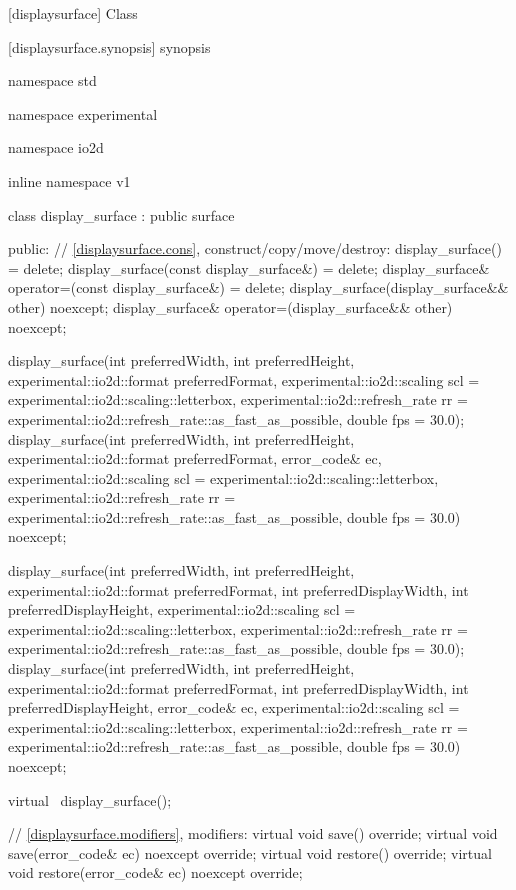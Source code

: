  [displaysurface] {Class }

 [displaysurface.synopsis] { synopsis}

\begin{codeblock}
namespace std { namespace experimental { namespace io2d { inline namespace v1 {
  class display_surface : public surface {
  public:
    // \ref{displaysurface.cons}, construct/copy/move/destroy:
    display_surface() = delete;
    display_surface(const display_surface&) = delete;
    display_surface& operator=(const display_surface&) = delete;
    display_surface(display_surface&& other) noexcept;
    display_surface& operator=(display_surface&& other) noexcept;
    
    display_surface(int preferredWidth, int preferredHeight, 
      experimental::io2d::format preferredFormat,
      experimental::io2d::scaling scl = experimental::io2d::scaling::letterbox,
      experimental::io2d::refresh_rate rr =
      experimental::io2d::refresh_rate::as_fast_as_possible, double fps = 30.0);
    display_surface(int preferredWidth, int preferredHeight, 
      experimental::io2d::format preferredFormat, error_code& ec,
      experimental::io2d::scaling scl = experimental::io2d::scaling::letterbox,
      experimental::io2d::refresh_rate rr =
      experimental::io2d::refresh_rate::as_fast_as_possible, double fps = 30.0)
      noexcept;
    
    display_surface(int preferredWidth, int preferredHeight, 
      experimental::io2d::format preferredFormat,
      int preferredDisplayWidth, int preferredDisplayHeight,
      experimental::io2d::scaling scl = experimental::io2d::scaling::letterbox,
      experimental::io2d::refresh_rate rr =
      experimental::io2d::refresh_rate::as_fast_as_possible, double fps = 30.0);
    display_surface(int preferredWidth, int preferredHeight, 
      experimental::io2d::format preferredFormat,
      int preferredDisplayWidth, int preferredDisplayHeight, error_code& ec,
      experimental::io2d::scaling scl = experimental::io2d::scaling::letterbox,
      experimental::io2d::refresh_rate rr =
      experimental::io2d::refresh_rate::as_fast_as_possible, double fps = 30.0) 
      noexcept;
    
    virtual ~display_surface();
    
    // \ref{displaysurface.modifiers}, modifiers:
    virtual void save() override;
    virtual void save(error_code& ec) noexcept override;
    virtual void restore() override;
    virtual void restore(error_code& ec) noexcept override;
    
}}}}}
\end{codeblock}
